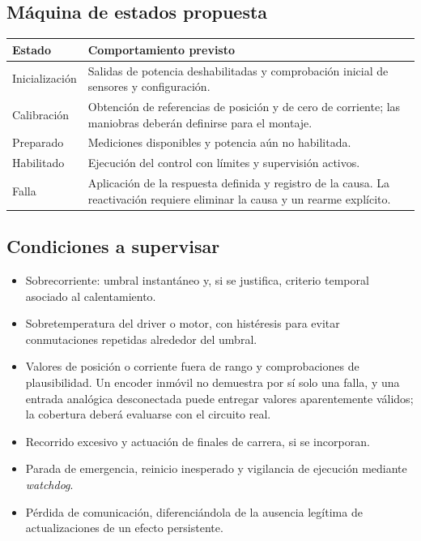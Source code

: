 \documentclass[11pt,a4paper]{article}
\begin{document}
\subsection{Máquina de estados propuesta}
\begin{tabularx}{\textwidth}{@{}p{}Y@{}}
\toprule
Estado & Comportamiento previsto \\
\midrule
Inicialización & Salidas de potencia deshabilitadas y comprobación inicial
de sensores y configuración. \\
Calibración & Obtención de referencias de posición y de cero de corriente;
las maniobras deberán definirse para el montaje. \\
Preparado & Mediciones disponibles y potencia aún no habilitada. \\
Habilitado & Ejecución del control con límites y supervisión activos. \\
Falla & Aplicación de la respuesta definida y registro de la causa.
La reactivación requiere eliminar la causa y un rearme explícito. \\
\bottomrule
\end{tabularx}

\subsection{Condiciones a supervisar}
\begin{itemize}
    \item Sobrecorriente: umbral instantáneo y, si se justifica, criterio
    temporal asociado al calentamiento.
    \item Sobretemperatura del driver o motor, con histéresis para evitar
    conmutaciones repetidas alrededor del umbral.
    \item Valores de posición o corriente fuera de rango y comprobaciones
    de plausibilidad. Un encoder inmóvil no demuestra por sí solo una falla,
    y una entrada analógica desconectada puede entregar valores aparentemente
    válidos; la cobertura deberá evaluarse con el circuito real.
    \item Recorrido excesivo y actuación de finales de carrera, si se incorporan.
    \item Parada de emergencia, reinicio inesperado y vigilancia de ejecución
    mediante \textit{watchdog}.
    \item Pérdida de comunicación, diferenciándola de la ausencia legítima
    de actualizaciones de un efecto persistente.
\end{itemize}
\end{document}
